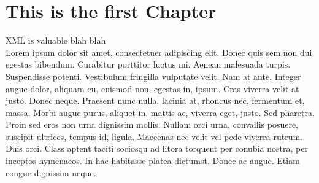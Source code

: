 %
%
%
%
%
%
%
%
%
%
%
%
%
%
%
%
%
%
%
%
%
%
%
%
%
%
%
%
%
%
%
%
%
%
%
%
%
%
%
%
%
%
%
%
%
%
%
%
%
%
%
%
%
%
%
%
%
%
%
%
%
%
%
%
%
%
%
%
%
%
%
%
%
%
%
%
%
%
%
%
%
%
%
%
%
%
%
%
%
%
%
%
%
%
%
%
%
%
%
%
%
%
%
%
%
%
%
%
%
%
%
%
%
%
%
%
%
%
%
%
%
%
%




\thesistitlepage

\thesiscopyrightpage              

\thesisabstract

\thesisdedicationpage

\thesisacknowledgements

\tableofcontents


\makeatletter \renewcommand{\@dotsep}{10000} \makeatother    %

\listoffigures





\newpage
{}




\chapter{This is the first Chapter}
XML is valuable blah blah\\
Lorem ipsum dolor sit amet, consectetuer adipiscing elit. Donec quis sem non dui egestas bibendum. Curabitur porttitor luctus mi. Aenean malesuada turpis. Suspendisse potenti. Vestibulum fringilla vulputate velit. Nam at ante. Integer augue dolor, aliquam eu, euismod non, egestas in, ipsum. Cras viverra velit at justo. Donec neque. Praesent nunc nulla, lacinia at, rhoncus nec, fermentum et, massa. Morbi augue purus, aliquet in, mattis ac, viverra eget, justo. Sed pharetra. Proin sed eros non urna dignissim mollis. Nullam orci urna, convallis posuere, suscipit ultrices, tempus id, ligula. Maecenas nec velit vel pede viverra rutrum. Duis orci. Class aptent taciti sociosqu ad litora torquent per conubia nostra, per inceptos hymenaeos. In hac habitasse platea dictumst. Donec ac augue. Etiam congue dignissim neque.
